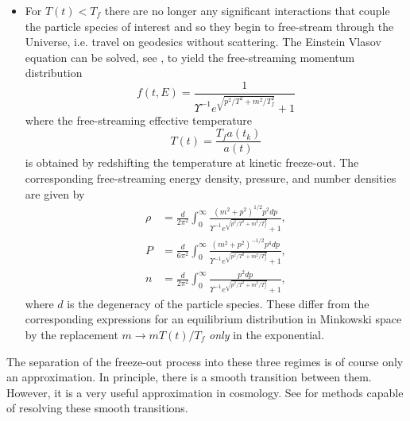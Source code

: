 \documentclass[universe,article,submit,moreauthors,pdftex,a4paper]{Definitions/mdpi}
\begin{document}
\begin{itemize}
\item
For $T(t)<T_f$ there are no longer any significant interactions that couple the particle species of interest and so they begin to free-stream through the Universe, i.e. travel on geodesics without scattering.  The Einstein Vlasov equation can be solved, see \cite{Choquet-Bruhat:2009xil}, to yield the free-streaming momentum distribution
\begin{equation}\label{free_stream_dist}
f(t,E)=\frac{1}{\Upsilon^{-1}e^{\sqrt{p^2/T^2+m^2 /T_f^2}}+ 1}
\end{equation}
where the free-streaming effective temperature
\begin{equation}\label{T_freestream_dist}
T(t)=\frac{T_fa(t_k)}{a(t)}
\end{equation}
is obtained by redshifting the temperature at kinetic freeze-out. The corresponding free-streaming energy density, pressure, and number densities are given by
\begin{align}
\rho&=\frac{d}{2\pi^2}\!\int_0^\infty\!\!\!\frac{\left(m^2+p^2\right)^{1/2}p^2dp }{\Upsilon^{-1}e^{\sqrt{p^2/T^2+m^2/T_f^2}}+ 1},\label{freestream_rho}\\[0.2cm]
P&=\frac{d}{6\pi^2}\!\int_0^\infty\!\!\!\frac{\left(m^2+p^2\right)^{-1/2}p^4dp }{\Upsilon^{-1} e^{\sqrt{p^2/T^2+m^2/T_f^2}}+ 1},\label{freestream_P}\\[0.2cm]
n&=\frac{d}{2\pi^2}\!\int_0^\infty\!\!\!\frac{p^2dp }{\Upsilon^{-1}e^{\sqrt{p^2/T^2+m^2/T_f^2}}+ 1},
\label{num_density}
\end{align}
where $d$ is the degeneracy of the particle species. These differ from the corresponding expressions for an equilibrium distribution in Minkowski space by the replacement $m\rightarrow m T(t)/T_f$  {\em only} in the exponential. 
\end{itemize}
The separation of the freeze-out process into these three regimes is of course only an approximation.  In principle, there is a smooth transition between them.  However, it is a very useful approximation in cosmology.  See \cite{Mangano:2005cc,Birrell:2014gea} for methods capable of resolving these smooth transitions.
\end{document}
